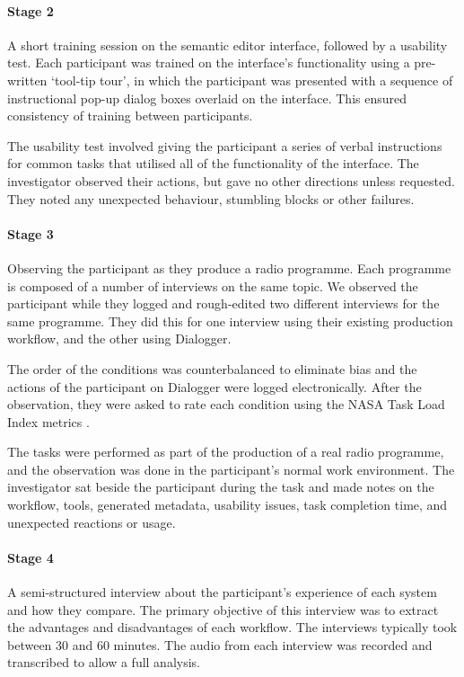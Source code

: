 \paragraph{Stage 2}
    A short training session on the semantic editor interface, followed by
    a usability test.  Each participant was trained on the interface's
    functionality using a pre-written `tool-tip tour', in which the participant
    was presented with a sequence of instructional pop-up dialog boxes overlaid
    on the interface.  This ensured consistency of training between
    participants.

    The usability test involved giving the participant a series of verbal
    instructions for common tasks that utilised all of the functionality of the
    interface. The investigator observed their actions, but gave no other
    directions unless requested. They noted any unexpected behaviour, stumbling
    blocks or other failures.

\paragraph{Stage 3}
    Observing the participant as they produce a radio programme.
    Each programme is composed of a number of interviews on the same topic. 
    We observed the participant while they logged and rough-edited two
    different interviews for the same programme. They did this for one
    interview using their existing production workflow, and the other using
    Dialogger.
    
    The order of the conditions was counterbalanced to
    eliminate bias and the actions of the participant on Dialogger were logged
    electronically. After the observation, they were asked to rate each
    condition using the NASA Task Load Index metrics
    \citep{Hart1988}.

    The tasks were performed as part of the production of a real radio programme,
    and the observation was done in the participant's normal work environment.
    The investigator sat beside the participant during the task and made notes
    on the workflow, tools, generated metadata, usability issues, task
    completion time, and unexpected reactions or usage.

\paragraph{Stage 4}
    A semi-structured interview about the participant's experience of each
    system and how they compare. The primary objective of this interview was to
    extract the advantages and disadvantages of each workflow. The interviews
    typically took between 30 and 60 minutes. The audio from each interview was
    recorded and transcribed to allow a full analysis.

